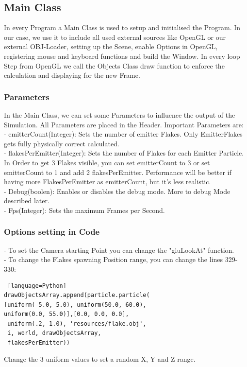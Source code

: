 \documentclass{sig-alternate-05-2015}
\begin{document}
\subsection{Main Class}
In every Program a Main Class is used to setup and initialised the Program. In our case, we use it to include all used external sources like OpenGL or our external OBJ-Loader, setting up the Scene, enable Options in OpenGL, registering mouse and keyboard functions and build the Window. In every loop Step from OpenGL we call the Objects Class draw function to enforce the calculation and displaying for the new Frame.\\
\subsubsection{Parameters}
In the Main Class, we can set some Parameters to influence the output of the Simulation. All Parameters are placed in the Header. Important Parameters are:\\
- emitterCount(Integer): Sets the number of emitter Flakes. Only EmitterFlakes gets fully physically correct calculated. \\
- flakesPerEmitter(Integer): Sets the number of Flakes for each Emitter Particle. In Order to get 3 Flakes visible, you can set emitterCount to 3 or set emitterCount to 1 and add 2 flakesPerEmitter. Performance will be better if having more FlakesPerEmitter as emitterCount, but it's less realistic.\\
- Debug(boolen): Enables or disables the debug mode. More to debug Mode described later. \\
- Fps(Integer): Sets the maximum Frames per Second.\\
\subsubsection{Options setting in Code}
- To set the Camera starting Point you can change the "gluLookAt" function.\\
- To change the Flakes spawning Position range, you can change the lines 329-330:\\
\begin{lstlisting} [language=Python]
drawObjectsArray.append(particle.particle(
[uniform(-5.0, 5.0), uniform(50.0, 60.0), 
uniform(0.0, 55.0)],[0.0, 0.0, 0.0],
 uniform(.2, 1.0), 'resources/flake.obj',
 i, world, drawObjectsArray,
 flakesPerEmitter))
\end{lstlisting}
Change the 3 uniform values to set a random X, Y and Z range. \\
\end{document}
